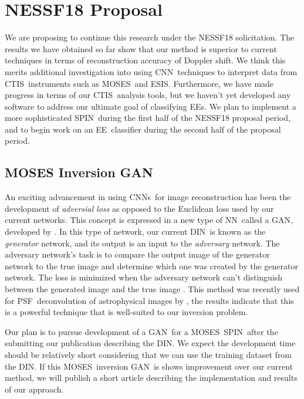 \documentclass[10pt,letterpaper, doublespace]{article}
\newcommand{\EE}{\ac{EE}}
\newcommand{\EEs}{\acp{EE}}
\newcommand{\CTIS}{\ac{CTIS}}
\newcommand{\MOSES}{\ac{MOSES}}
\newcommand{\ESIS}{\ac{ESIS}}
\newcommand{\NN}{\ac{NN}}
\newcommand{\CNN}{\ac{CNN}}
\newcommand{\CNNs}{\acp{CNN}}
\newcommand{\DIN}{\ac{DIN}}
\newcommand{\SPIN}{\ac{SPIN}}
\newcommand{\GAN}{\ac{GAN}}
\newcommand{\PSF}{\ac{PSF}}
\begin{document}
	\section{NESSF18 Proposal}
	
		We are proposing to continue this research under the NESSF18 solicitation.
		The results we have obtained so far show that our method is superior to current techniques in terms of reconstruction accuracy of Doppler shift.
		We think this merits additional investigation into using \CNN\ techniques to interpret data from \CTIS\ instruments such as \MOSES\ and \ESIS.
		Furthermore, we have made progress in terms of our \CTIS\ analysis tools, but we haven't yet developed any software to address our ultimate goal of classifying \EEs.
		We plan to implement a more sophisticated \SPIN\ during the first half of the NESSF18 proposal period, and to begin work on an \EE\ classifier during the second half of the proposal period.
	
		\subsection{MOSES Inversion GAN} \label{sec_gan}
		
			An exciting advancement in using \CNNs\ for image reconstruction has been the development of \textit{adversial loss} as opposed to the Euclidean loss used by our current networks. 
			This concept is expressed in a new type of \NN\ called a \GAN, developed by \cite{Goodfellow2014}. 
			In this type of network, our current \DIN\ is known as the \textit{generator} network, and its output is an input to the \textit{adversary} network. 
			The adversary network's task is to compare the output image of the generator network to the true image and determine which one was created by the generator network.
			The loss is minimized when the adversary network can't distinguish between the generated image and the true image \cite{Isola2016}.
			This method was recently used for \PSF\ deconvolution of astrophysical images by \cite{Schawinski2017}, the results indicate that this is a powerful technique that is well-suited to our inversion problem.
			
			Our plan is to pursue development of a \GAN\ for a \MOSES\ \SPIN\ after the submitting our publication describing the \DIN.
			We expect the development time should be relatively short considering that we can use the training dataset from the \DIN.
			If this \MOSES\ inversion \GAN\ is shows improvement over our current method, we will publish a short article describing the implementation and results of our approach.
			
\end{document}
